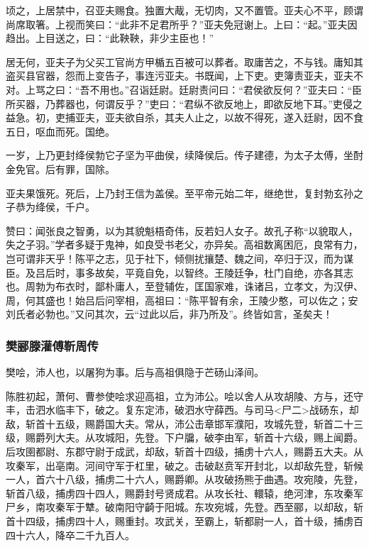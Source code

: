 \documentclass[]{article}
\begin{document}
顷之，上居禁中，召亚夫赐食。独置大胾，无切肉，又不置管。亚夫心不平，顾谓尚席取箸。上视而笑曰：``此非不足君所乎？''亚夫免冠谢上。上曰：``起。''亚夫因趋出。上目送之，曰：``此鞅鞅，非少主臣也！''

居无何，亚夫子为父买工官尚方甲楯五百被可以葬者。取庸苦之，不与钱。庸知其盗买县官器，怨而上变告子，事连污亚夫。书既闻，上下吏。吏簿责亚夫，亚夫不对。上骂之曰：``吾不用也。''召诣廷尉。廷尉责问曰：``君侯欲反何？''亚夫曰：``臣所买器，乃葬器也，何谓反乎？''吏曰：``君纵不欲反地上，即欲反地下耳。''吏侵之益急。初，吏捕亚夫，亚夫欲自杀，其夫人止之，以故不得死，遂入廷尉，因不食五日，呕血而死。国绝。

一岁，上乃更封绛侯勃它子坚为平曲侯，续降侯后。传子建德，为太子太傅，坐酎金免官。后有罪，国除。

亚夫果饿死。死后，上乃封王信为盖侯。至平帝元始二年，继绝世，复封勃玄孙之子恭为绛侯，千户。

赞曰：闻张良之智勇，以为其貌魁梧奇伟，反若妇人女子。故孔子称``以貌取人，失之子羽。''学者多疑于鬼神，如良受书老父，亦异矣。高祖数离困厄，良常有力，岂可谓非天乎！陈平之志，见于社下，倾侧扰攘楚、魏之间，卒归于汉，而为谋臣。及吕后时，事多故矣，平竟自免，以智终。王陵廷争，杜门自绝，亦各其志也。周勃为布衣时，鄙朴庸人，至登辅佐，匡国家难，诛诸吕，立孝文，为汉伊、周，何其盛也！始吕后问宰相，高祖曰：``陈平智有余，王陵少憨，可以佐之；安刘氏者必勃也。''又问其次，云``过此以后，非乃所及''。终皆如言，圣矣夫！

\hypertarget{header-n3842}{%
\subsubsection{樊郦滕灌傅靳周传}\label{header-n3842}}

樊哙，沛人也，以屠狗为事。后与高祖俱隐于芒砀山泽间。

陈胜初起，萧何、曹参使哙求迎高祖，立为沛公。哙以舍人从攻胡陵、方与，还守丰，击泗水临丰下，破之。复东定沛，破泗水守薛西。与司马\textless{}尸二\textgreater{}战砀东，却敌，斩首十五级，赐爵国大夫。常从，沛公击章邯军濮阳，攻城先登，斩首二十三级，赐爵列大夫。从攻城阳，先登。下户牖，破李由军，斩首十六级，赐上闻爵。后攻圉都尉、东郡守尉于成武，却敌，斩首十四级，捕虏十六人，赐爵五大夫。从攻秦军，出亳南。河间守军于杠里，破之。击破赵贲军开封北，以却敌先登，斩候一人，首六十八级，捕虏二十六人，赐爵卿。从攻破扬熊于曲遇。攻宛陵，先登，斩首八级，捕虏四十四人，赐爵封号贤成君。从攻长社、轘辕，绝河津，东攻秦军尸乡，南攻秦军于犨。破南阳守齮于阳城。东攻宛城，先登。西至郦，以却敌，斩首十四级，捕虏四十人，赐重封。攻武关，至霸上，斩都尉一人，首十级，捕虏百四十六人，降卒二千九百人。
\end{document}
